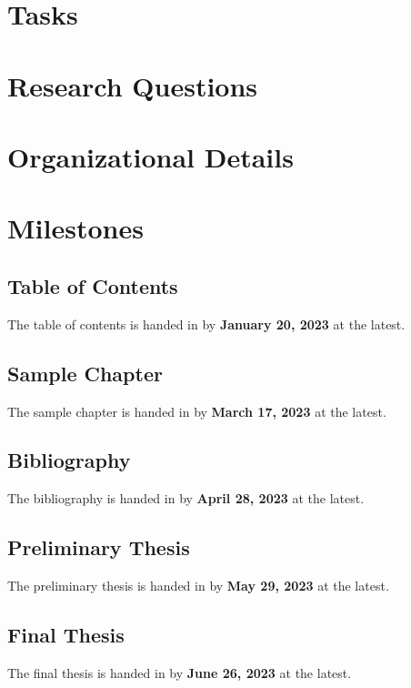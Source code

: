 \documentclass[english,notitlepage,smartquotes]{hgbreport}
\begin{document}
\section{Tasks}

\section{Research Questions}

\section{Organizational Details}

\section{Milestones}

\subsection{Table of Contents}

The table of contents is handed in by \textbf{January 20, 2023} at the latest.

\subsection{Sample Chapter}

The sample chapter is handed in by \textbf{March 17, 2023} at the latest.

\subsection{Bibliography}

The bibliography is handed in by \textbf{April 28, 2023} at the latest.

\subsection{Preliminary Thesis}

The preliminary thesis is handed in by \textbf{May 29, 2023} at the latest.

\subsection{Final Thesis}

The final thesis is handed in by \textbf{June 26, 2023} at the latest.
\end{document}
